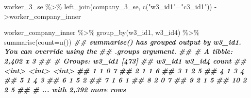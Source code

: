 \documentclass[
]{book}
\newenvironment{Shaded}{\begin{snugshade}}{\end{snugshade}}
\newcommand{\AttributeTok}[1]{\textcolor[rgb]{0.77,0.63,0.00}{#1}}
\newcommand{\DocumentationTok}[1]{\textcolor[rgb]{0.56,0.35,0.01}{\textbf{\textit{#1}}}}
\newcommand{\FunctionTok}[1]{\textcolor[rgb]{0.00,0.00,0.00}{#1}}
\newcommand{\NormalTok}[1]{#1}
\newcommand{\OtherTok}[1]{\textcolor[rgb]{0.56,0.35,0.01}{#1}}
\newcommand{\SpecialCharTok}[1]{\textcolor[rgb]{0.00,0.00,0.00}{#1}}
\newcommand{\StringTok}[1]{\textcolor[rgb]{0.31,0.60,0.02}{#1}}
\theoremstyle{definition}
\theoremstyle{definition}
\theoremstyle{definition}
\theoremstyle{definition}
\theoremstyle{remark}
\begin{document}
\begin{Shaded}
\begin{Highlighting}[]

\NormalTok{worker\_3\_se }\SpecialCharTok{\%\textgreater{}\%}
  \FunctionTok{left\_join}\NormalTok{(company\_3\_se, }\FunctionTok{c}\NormalTok{(}\StringTok{"w3\_id1"}\OtherTok{=}\StringTok{"c3\_id1"}\NormalTok{)) }\OtherTok{{-}\textgreater{}}\NormalTok{worker\_company\_inner}

\NormalTok{worker\_company\_inner }\SpecialCharTok{\%\textgreater{}\%} 
  \FunctionTok{group\_by}\NormalTok{(w3\_id1, w3\_id4) }\SpecialCharTok{\%\textgreater{}\%} 
  \FunctionTok{summarise}\NormalTok{(}\AttributeTok{count=}\FunctionTok{n}\NormalTok{())}
\DocumentationTok{\#\# \textasciigrave{}summarise()\textasciigrave{} has grouped output by \textquotesingle{}w3\_id1\textquotesingle{}. You can override using the}
\DocumentationTok{\#\# \textasciigrave{}.groups\textasciigrave{} argument.}
\DocumentationTok{\#\# \# A tibble: 2,402 x 3}
\DocumentationTok{\#\# \# Groups:   w3\_id1 [473]}
\DocumentationTok{\#\#    w3\_id1 w3\_id4 count}
\DocumentationTok{\#\#     \textless{}int\textgreater{}  \textless{}int\textgreater{} \textless{}int\textgreater{}}
\DocumentationTok{\#\#  1      1      0     7}
\DocumentationTok{\#\#  2      1      1     6}
\DocumentationTok{\#\#  3      1      2     5}
\DocumentationTok{\#\#  4      1      3     4}
\DocumentationTok{\#\#  5      1      4     3}
\DocumentationTok{\#\#  6      1      5     2}
\DocumentationTok{\#\#  7      1      6     1}
\DocumentationTok{\#\#  8      2      0     7}
\DocumentationTok{\#\#  9      2      1     5}
\DocumentationTok{\#\# 10      2      2     5}
\DocumentationTok{\#\# \# ... with 2,392 more rows}


\end{Highlighting}
\end{Shaded}
\end{document}
